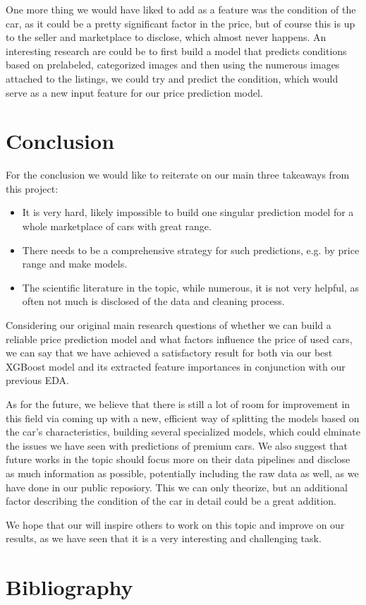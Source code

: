 \documentclass[12pt]{article}
\begin{document}
One more thing we would have liked to add as a feature was the condition of the car, as it could be a pretty significant factor in the price, but of course this is up to the seller and marketplace to disclose, which almost never happens.
An interesting research are could be to first build a model that predicts conditions based on prelabeled, categorized images and then using the numerous images attached to the listings, we could try and predict the condition, which would serve as a new input feature for our price prediction model.

\newpage
\section{Conclusion}

For the conclusion we would like to reiterate on our main three takeaways from this project:

\begin{itemize}
  \item It is very hard, likely impossible to build one singular prediction model for a whole marketplace of cars with great range.
  \item There needs to be a comprehensive strategy for such predictions, e.g. by price range and make models.
  \item The scientific literature in the topic, while numerous, it is not very helpful, as often not much is disclosed of the data and cleaning process.
\end{itemize}
 
Considering our original main research questions of whether we can build a reliable price prediction model and what factors influence the price of used cars, we can say that we have achieved a satisfactory result for both via our best XGBoost model and its extracted feature importances in conjunction with our previous EDA.

As for the future, we believe that there is still a lot of room for improvement in this field via coming up with a new, efficient way of splitting the models based on the car's characteristics, building several specialized models, which could elminate the issues we have seen with predictions of premium cars.
We also suggest that future works in the topic should focus more on their data pipelines and disclose as much information as possible, potentially including the raw data as well, as we have done in our public reposiory.
This we can only theorize, but an additional factor describing the condition of the car in detail could be a great addition.

We hope that our will inspire others to work on this topic and improve on our results, as we have seen that it is a very interesting and challenging task.

\newpage
\FloatBarrier
\section{Bibliography}
\printbibliography[heading=none]
\end{document}
